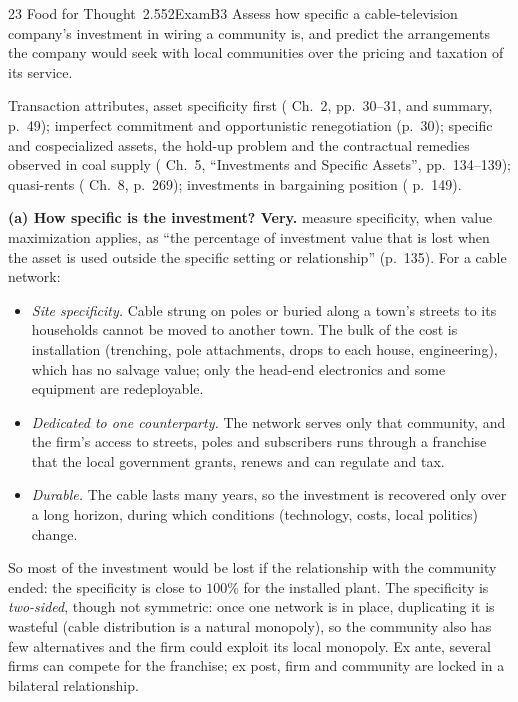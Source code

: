 \begin{exsol}{23}{\MR{} Food for Thought~2.5}{52}{Exam}{B3}
\asked Assess how specific a cable-television company's investment in wiring a community is,
and predict the arrangements the company would seek with local communities over the pricing and
taxation of its service.

\method Transaction attributes, asset specificity first (\MR{} Ch.~2, pp.~30--31, and summary,
p.~49); imperfect commitment and opportunistic renegotiation (p.~30); specific and cospecialized
assets, the hold-up problem and the contractual remedies observed in coal supply (\MR{} Ch.~5,
``Investments and Specific Assets'', pp.~134--139); quasi-rents (\MR{} Ch.~8, p.~269);
investments in bargaining position (\MR{} p.~149).

\solution
\textbf{(a) How specific is the investment? Very.} \MR{} measure specificity, when value
maximization applies, as ``the percentage of investment value that is lost when the asset is
used outside the specific setting or relationship'' (p.~135). For a cable network:
\begin{itemize}
  \item \emph{Site specificity.} Cable strung on poles or buried along a town's streets to its
  households cannot be moved to another town. The bulk of the cost is installation (trenching,
  pole attachments, drops to each house, engineering), which has no salvage value; only the
  head-end electronics and some equipment are redeployable.
  \item \emph{Dedicated to one counterparty.} The network serves only that community, and the
  firm's access to streets, poles and subscribers runs through a franchise that the local
  government grants, renews and can regulate and tax.
  \item \emph{Durable.} The cable lasts many years, so the investment is recovered only over a
  long horizon, during which conditions (technology, costs, local politics) change.
\end{itemize}
So most of the investment would be lost if the relationship with the community ended: the
specificity is close to $100\%$ for the installed plant. The specificity is \emph{two-sided}, though
not symmetric: once one network is in place, duplicating it is wasteful (cable distribution is a
natural monopoly), so the community also has few alternatives and the firm could exploit its
local monopoly. Ex ante, several firms can compete for the franchise; ex post, firm and community
are locked in a bilateral relationship.


\end{exsol}
